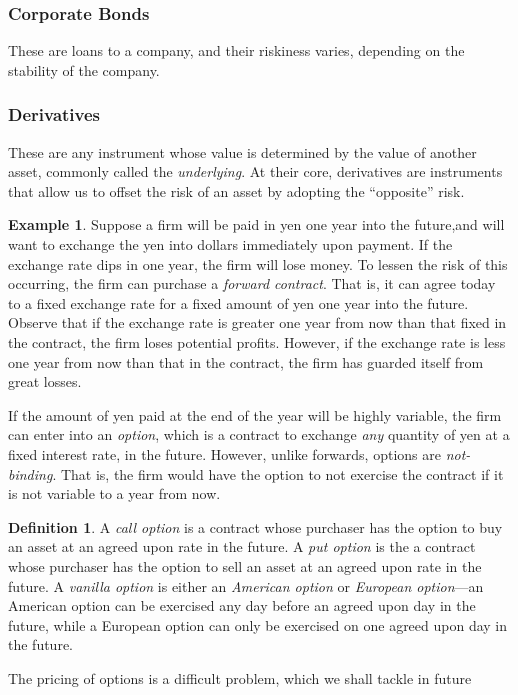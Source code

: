 \documentclass[12pt]{article}
\theoremstyle{plain}
\theoremstyle{definition}
\newtheorem*{definition}{Definition}
\newtheorem*{example}{Example}
\theoremstyle{remark}
\numberwithin{equation}{section}  %
\begin{document}
\subsubsection{Corporate Bonds}
These are loans to a company, and their riskiness varies, depending on the 
stability of the company. 
\subsubsection{Derivatives}
These are any instrument whose value is determined by the value of another 
asset, commonly called the \emph{underlying}. At their core, derivatives are 
instruments that allow us to offset the risk of an asset by adopting the 
``opposite'' risk.
\begin{example}
	Suppose a firm will be paid in yen one year into the future,and will want 
	to exchange the yen into dollars immediately upon payment.
	If the exchange rate dips in one year, the firm will lose money. To lessen 
	the risk of this occurring, the firm can purchase a \emph{forward 
	contract}. That is, it can agree today to a fixed exchange rate for a fixed 
	amount of yen one year into the future. Observe that if the exchange rate 
	is greater one year from now than that fixed in the contract, the firm 
	loses potential profits. However, if the exchange rate is less one year 
	from now than that in the contract, the firm has guarded itself from great 
	losses. 
\end{example}
If the amount of yen paid at the end of the year will be highly variable, the 
firm can enter into an \emph{option}, which is a contract to exchange 
\emph{any} quantity of yen at a fixed interest rate, in the future. However, 
unlike forwards, options are \emph{not-binding}. That is, the firm would have 
the option to not exercise the contract if it is not variable to a year from 
now.
\begin{definition}
	A \emph{call option} is a contract whose purchaser has the option to buy an 
	asset at an agreed upon rate in the future. A \emph{put option} is the a 
	contract whose purchaser has the option to sell an asset at an agreed upon 
	rate in the future. A \emph{vanilla option} is either an \emph{American 
	option} or \emph{European option}---an American option can be exercised any 
	day before an agreed upon day in the future, while a European option can 
	only be exercised on one agreed upon day in the future.
\end{definition}
The pricing of options is a difficult problem, which we shall tackle in future 
\end{document}
